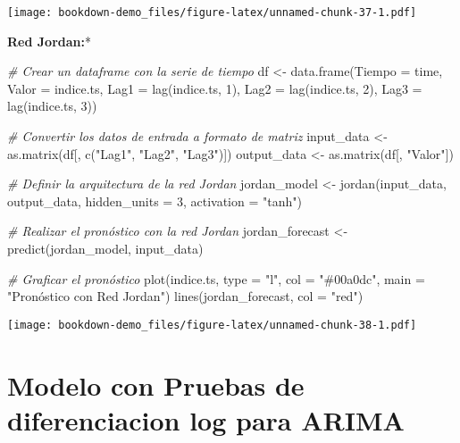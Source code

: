 \documentclass[
]{book}
\newenvironment{Shaded}{\begin{snugshade}}{\end{snugshade}}
\newcommand{\AttributeTok}[1]{\textcolor[rgb]{0.77,0.63,0.00}{#1}}
\newcommand{\CommentTok}[1]{\textcolor[rgb]{0.56,0.35,0.01}{\textit{#1}}}
\newcommand{\DecValTok}[1]{\textcolor[rgb]{0.00,0.00,0.81}{#1}}
\newcommand{\FunctionTok}[1]{\textcolor[rgb]{0.00,0.00,0.00}{#1}}
\newcommand{\NormalTok}[1]{#1}
\newcommand{\OtherTok}[1]{\textcolor[rgb]{0.56,0.35,0.01}{#1}}
\newcommand{\StringTok}[1]{\textcolor[rgb]{0.31,0.60,0.02}{#1}}
\begin{document}
\texttt{[image: bookdown-demo\_files/figure-latex/unnamed-chunk-37-1.pdf]}

\textbf{Red Jordan:}*

\begin{Shaded}
\begin{Highlighting}[]
\CommentTok{\# Crear un dataframe con la serie de tiempo}
\NormalTok{df }\OtherTok{\textless{}{-}} \FunctionTok{data.frame}\NormalTok{(}\AttributeTok{Tiempo =}\NormalTok{ time,}
                 \AttributeTok{Valor =}\NormalTok{ indice.ts,}
                 \AttributeTok{Lag1 =} \FunctionTok{lag}\NormalTok{(indice.ts, }\DecValTok{1}\NormalTok{),}
                 \AttributeTok{Lag2 =} \FunctionTok{lag}\NormalTok{(indice.ts, }\DecValTok{2}\NormalTok{),}
                 \AttributeTok{Lag3 =} \FunctionTok{lag}\NormalTok{(indice.ts, }\DecValTok{3}\NormalTok{))}

\CommentTok{\# Convertir los datos de entrada a formato de matriz}
\NormalTok{input\_data }\OtherTok{\textless{}{-}} \FunctionTok{as.matrix}\NormalTok{(df[, }\FunctionTok{c}\NormalTok{(}\StringTok{"Lag1"}\NormalTok{, }\StringTok{"Lag2"}\NormalTok{, }\StringTok{"Lag3"}\NormalTok{)])}
\NormalTok{output\_data }\OtherTok{\textless{}{-}} \FunctionTok{as.matrix}\NormalTok{(df[, }\StringTok{"Valor"}\NormalTok{])}

\CommentTok{\# Definir la arquitectura de la red Jordan}
\NormalTok{jordan\_model }\OtherTok{\textless{}{-}} \FunctionTok{jordan}\NormalTok{(input\_data, output\_data, }\AttributeTok{hidden\_units =} \DecValTok{3}\NormalTok{, }\AttributeTok{activation =} \StringTok{"tanh"}\NormalTok{)}

\CommentTok{\# Realizar el pronóstico con la red Jordan}
\NormalTok{jordan\_forecast }\OtherTok{\textless{}{-}} \FunctionTok{predict}\NormalTok{(jordan\_model, input\_data)}

\CommentTok{\# Graficar el pronóstico}
\FunctionTok{plot}\NormalTok{(indice.ts, }\AttributeTok{type =} \StringTok{"l"}\NormalTok{, }\AttributeTok{col =} \StringTok{"\#00a0dc"}\NormalTok{, }\AttributeTok{main =} \StringTok{"Pronóstico con Red Jordan"}\NormalTok{)}
\FunctionTok{lines}\NormalTok{(jordan\_forecast, }\AttributeTok{col =} \StringTok{"red"}\NormalTok{)}
\end{Highlighting}
\end{Shaded}

\texttt{[image: bookdown-demo\_files/figure-latex/unnamed-chunk-38-1.pdf]}

\hypertarget{modelo-con-pruebas-de-diferenciacion-log-para-arima}{%
\chapter{Modelo con Pruebas de diferenciacion log para ARIMA}\label{modelo-con-pruebas-de-diferenciacion-log-para-arima}}
\end{document}
